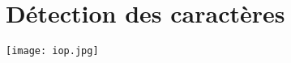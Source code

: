 \documentclass[a4paper,10pt]{report}
\begin{document}


\appendix

\section{D\'etection des caract\`eres} %
\label{sec:d'etection_des_caract`eres}

\begin{center}
	
	\texttt{[image: iop.jpg]}\\
\end{center}

\end{document}
